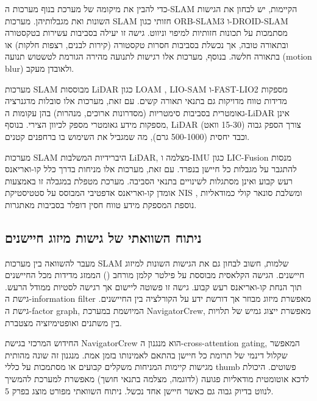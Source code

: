 כדי להבין את מיקומה של מערכת  בנוף מערכות ה-SLAM הקיימות, יש לבחון את הגישות השונות ואת מגבלותיהן. מערכות SLAM חזותי כגון ORB-SLAM3 \cite{Campos2021ORBSLAM3} ו-DROID-SLAM \cite{Teed2021DROIDSLAM} מסתמכות על תכונות חזותיות למיפוי וניווט. גישה זו יעילה בסביבות עשירות בטקסטורה ובתאורה טובה, אך נכשלת בסביבות חסרות טקסטורה (קירות לבנים, רצפות חלקות) או בתאורה חלשה. בנוסף, מערכות אלו רגישות לתנועה מהירה הגורמת לטשטוש תנועה (motion blur) ולאובדן מעקב.

מערכות SLAM מבוססות LiDAR כגון LOAM \cite{Zhang2014LOAM}, LIO-SAM \cite{Shan2020LIOSAM} ו-FAST-LIO2 \cite{Xu2022FASTLIO2} מספקות מדידות טווח מדויקות גם בתנאי תאורה קשים. עם זאת, מערכות אלו סובלות מדגנרציה גאומטרית בסביבות סימטריות (מסדרונות ארוכים, מנהרות) בהן עקומות ה-LiDAR אינן מספקות מידע גאומטרי מספק לכיוון הצירי. בנוסף, LiDAR צורך הספק גבוה (15-30 וואט) וכבד יחסית (500-1000 גרם), מה שמגביל את השימוש בו ברחפנים קטנים.

מערכות SLAM היברידיות המשלבות LiDAR, מצלמה ו-IMU כגון LIC-Fusion \cite{Zuo2020LICFusion} מנסות להתגבר על מגבלות כל חיישן בנפרד. עם זאת, מערכות אלו מניחות בדרך כלל קו-ואריאנס רעש קבוע ואינן מסתגלות לשינויים בתנאי הסביבה. מערכת  מטפלת במגבלה זו באמצעות אומדן קו-ואריאנס אדפטיבי המבוסס על סטטיסטיקת NIS \cite{BenDavid2022Adaptive}, ומשלבת סונאר קולי כמודאליות נוספת המספקת מידע טווח חסין דופלר בסביבות מאתגרות.

\subsection{ניתוח השוואתי של גישות מיזוג חיישנים}
\label{sec:ch01_fusion_comparison}

מעבר להשוואה בין מערכות SLAM שלמות, חשוב לבחון גם את הגישות השונות למיזוג חיישנים. הגישה הקלאסית מבוססת על פילטר קלמן מורחב () הממזג מדידות מכל החיישנים תוך הנחת קו-ואריאנס רעש קבוע. גישה זו פשוטה ליישום אך רגישה לסטיות ממודל הרעש. גישת ה-information filter מאפשרת מיזוג מבוזר אך דורשת ידע על הקורלציה בין החיישנים. גישת ה-factor graph, המיושמת במערכת NavigatorCrew, מאפשרת ייצוג גמיש של תלויות בין משתנים ואופטימיזציה מצטברת.

החידוש המרכזי בגישת NavigatorCrew הוא מנגנון ה-cross-attention gating, המאפשר שקלול דינמי של תרומת כל חיישן בהתאם לאמינותו בזמן אמת. מנגנון זה שונה מהותית מגישות קיימות המניחות משקלים קבועים או מסתמכות על כללי thumb פשוטים. היכולת לדכא אוטומטית מודאליות פגועה (לדוגמה, מצלמה בתנאי חושך) מאפשרת למערכת להמשיך לנווט בדיוק גבוה גם כאשר חיישן אחד נכשל. ניתוח השוואתי מפורט מוצג בפרק 5.

